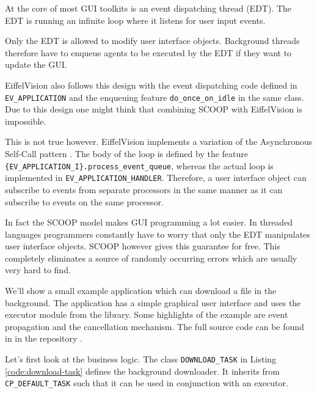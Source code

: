 At the core of most GUI toolkits is an event dispatching thread (EDT).
The EDT is running an infinite loop where it listens for user input events.

Only the EDT is allowed to modify user interface objects.
Background threads therefore have to enqueue agents to be executed by the EDT if they want to update the GUI.

EiffelVision also follows this design with the event dispatching code defined in \lstinline!EV_APPLICATION! and the enqueuing feature \lstinline!do_once_on_idle! in the same class.
Due to this design one might think that combining SCOOP with EiffelVision is impossible.

This is not true however.
EiffelVision implements a variation of the Asynchronous Self-Call pattern .
The body of the loop is defined by the feature \lstinline!{EV_APPLICATION_I}.process_event_queue!, whereas the actual loop is implemented in \lstinline!EV_APPLICATION_HANDLER!.
Therefore, a user interface object can subscribe to events from separate processors in the same manner as it can subscribe to events on the same processor.

In fact the SCOOP model makes GUI programming a lot easier.
In threaded languages programmers constantly have to worry that only the EDT manipulates user interface objects.
SCOOP however gives this guarantee for free.
This completely eliminates a source of randomly occurring errors which are usually very hard to find.

We'll show a small example application which can download a file in the background.
The application has a simple graphical user interface and uses the executor module from the library.
Some highlights of the example are event propagation and the cancellation mechanism.
The full source code can be found in  in the repository \cite{web:repository}.

Let's first look at the business logic.
The class \lstinline!DOWNLOAD_TASK! in Listing \ref{code:download-task} defines the background downloader.
It inherits from \lstinline!CP_DEFAULT_TASK! such that it can be used in conjunction with an executor.


